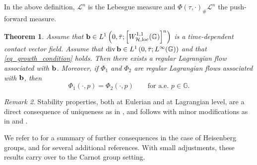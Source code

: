 \documentclass[11pt]{amsart}
\newcommand{\hhh}{{\mathcal{H}}}
\newcommand{\bb}{{\bf {b}}} %
\DeclareMathOperator{\divv}{div}
\theoremstyle{plain}
\newtheorem{theorem}{Theorem}[section]
\theoremstyle{definition}
\theoremstyle{remark}
\newtheorem{remark}[theorem]{Remark}
\numberwithin{equation}{section}
\begin{document}
In the above definition,  $\mathcal{L}^n$ is the Lebesgue measure and $\Phi(\tau,\cdot)_\#\mathcal{L}^n$ the push-forward measure.
\begin{theorem}
Assume that $\bb \in L^1\left(0,\bar{\tau};\left[W^{1,1}_{\hhh,\mathrm{loc}}(\mathbb{G})\right]^n\right)$ is a time-dependent contact vector field. Assume that $\divv \bb \in L^1\left(0,\bar{\tau};L^\infty(\mathbb{G})\right)$ and that \eqref{eq_growth_condition} holds. Then there exists a regular Lagrangian flow associated with $\bb$. Moreover, if $\Phi_1$ and $\Phi_2$ are regular Lagrangian flows associated with $\bb$, then
\begin{equation*}
    \Phi_1(\cdot,p)=\Phi_2(\cdot,p)\qquad\text{for a.e.~$p\in \mathbb G$.}
\end{equation*}
\end{theorem}
\begin{remark}
    Stability properties, both at Eulerian and at Lagrangian level, are a direct consequence of uniqueness as in , and follows with minor modifications as in \cite[Section $\mathrm{II}$]{MR1022305} and \cite[Section 5]{MR2409676}.
\end{remark}
We refer to \cite[Section 5]{dpl1} for a summary of further consequences in the case of Heisenberg groups, and for several additional references. With small adjustments, these results carry over to the Carnot group setting.


\appendix
\end{document}
